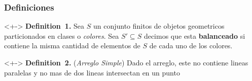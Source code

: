 \documentclass[xcolor=table]{beamer}
\begin{document}
\begin{mdframe}%

\frametitle{Definiciones}\label{heading-sec-definiciones}%

\begin{mdbmarginx}{1ex}{0pt}{1ex}{0pt}%
\begin{onlyenv}<+->%
\noindent{}\textbf{Definition~1.} \mdbr
{}  Sea $S$ un conjunto finitos de objetos geometricos particionados en clases o \emph{colores}.
  Sea $S'\subseteq S$ decimos que esta \textbf{balanceado} si contiene la misma cantidad de elementos
  de $S$ de cada uno de los colores.%
\end{onlyenv}%
\end{mdbmarginx}%

\begin{mdbmarginx}{1ex}{0pt}{1ex}{0pt}%
\begin{onlyenv}<+->%
\noindent{}\textbf{Definition~2.} ({\itshape Arreglo Simple})\mdbr
{}  Dado el arreglo, este no contiene lineas paralelas y no mas de dos lineas intersectan
  en un punto%
\end{onlyenv}%
\end{mdbmarginx}%
\end{mdframe}\label{sec-definiciones}%
\end{document}
